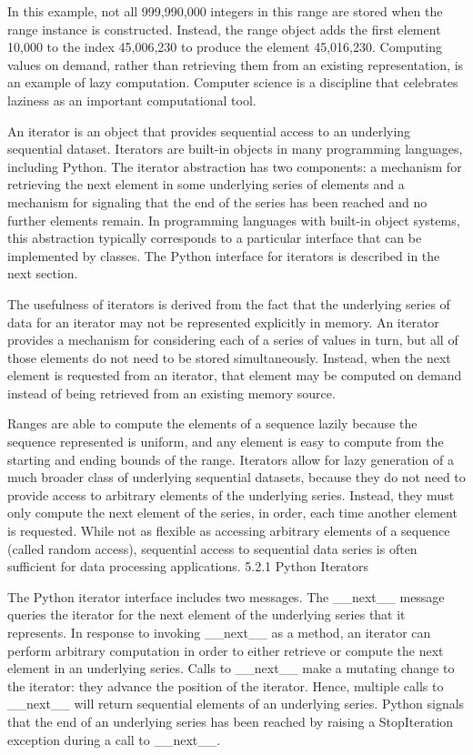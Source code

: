 \documentclass[letterpaper,10pt,dvipdfmx]{sphinxmanual}
\begin{document}
In this example, not all 999,990,000 integers in this range are stored when the range instance is constructed. Instead, the range object adds the first element 10,000 to the index 45,006,230 to produce the element 45,016,230. Computing values on demand, rather than retrieving them from an existing representation, is an example of lazy computation. Computer science is a discipline that celebrates laziness as an important computational tool.

An iterator is an object that provides sequential access to an underlying sequential dataset. Iterators are built-in objects in many programming languages, including Python. The iterator abstraction has two components: a mechanism for retrieving the next element in some underlying series of elements and a mechanism for signaling that the end of the series has been reached and no further elements remain. In programming languages with built-in object systems, this abstraction typically corresponds to a particular interface that can be implemented by classes. The Python interface for iterators is described in the next section.

The usefulness of iterators is derived from the fact that the underlying series of data for an iterator may not be represented explicitly in memory. An iterator provides a mechanism for considering each of a series of values in turn, but all of those elements do not need to be stored simultaneously. Instead, when the next element is requested from an iterator, that element may be computed on demand instead of being retrieved from an existing memory source.

Ranges are able to compute the elements of a sequence lazily because the sequence represented is uniform, and any element is easy to compute from the starting and ending bounds of the range. Iterators allow for lazy generation of a much broader class of underlying sequential datasets, because they do not need to provide access to arbitrary elements of the underlying series. Instead, they must only compute the next element of the series, in order, each time another element is requested. While not as flexible as accessing arbitrary elements of a sequence (called random access), sequential access to sequential data series is often sufficient for data processing applications.
5.2.1   Python Iterators

The Python iterator interface includes two messages. The \_\_next\_\_ message queries the iterator for the next element of the underlying series that it represents. In response to invoking \_\_next\_\_ as a method, an iterator can perform arbitrary computation in order to either retrieve or compute the next element in an underlying series. Calls to \_\_next\_\_ make a mutating change to the iterator: they advance the position of the iterator. Hence, multiple calls to \_\_next\_\_ will return sequential elements of an underlying series. Python signals that the end of an underlying series has been reached by raising a StopIteration exception during a call to \_\_next\_\_.
\end{document}
